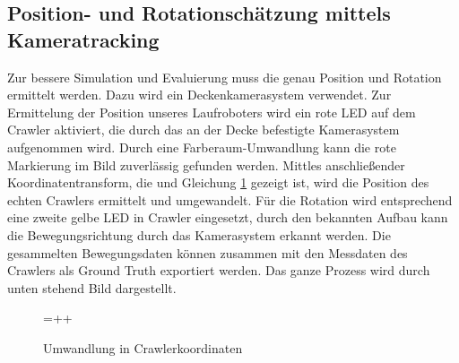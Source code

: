\subsection{Position- und Rotationschätzung mittels Kameratracking}
Zur bessere Simulation und Evaluierung muss die genau Position und Rotation ermittelt werden. Dazu wird ein Deckenkamerasystem verwendet. Zur Ermittelung der Position unseres Laufroboters wird ein rote LED auf dem Crawler aktiviert, die durch das an der Decke befestigte Kamerasystem aufgenommen wird. Durch eine Farberaum-Umwandlung kann die rote Markierung im Bild zuverlässig gefunden werden. Mittles anschließender  Koordinatentransform, die und Gleichung \ref{fig:coordinates} gezeigt ist,  wird die Position des echten Crawlers ermittelt und umgewandelt.
Für die Rotation wird entsprechend eine zweite gelbe LED in Crawler eingesetzt, durch den bekannten Aufbau kann die Bewegungsrichtung durch das Kamerasystem erkannt werden. Die gesammelten Bewegungsdaten können zusammen mit den Messdaten des Crawlers als Ground Truth exportiert werden. Das ganze Prozess wird durch unten stehend Bild dargestellt.

\begin{figure}
    \centering
     =+  + \\
    \caption{Umwandlung in Crawlerkoordinaten}
	\label{fig:coordinates}
\end{figure}


